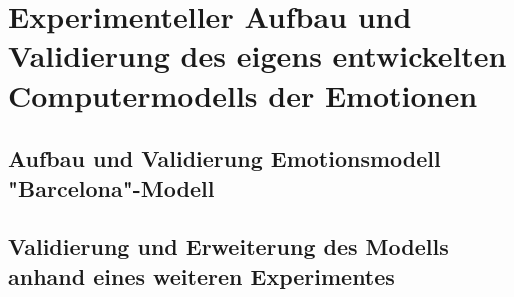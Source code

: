 \chapter{Experimenteller Aufbau und Validierung des eigens entwickelten Computermodells der Emotionen}
 \section{Aufbau und Validierung Emotionsmodell "Barcelona"-Modell}
 \section{Validierung und Erweiterung des Modells anhand eines weiteren Experimentes}
